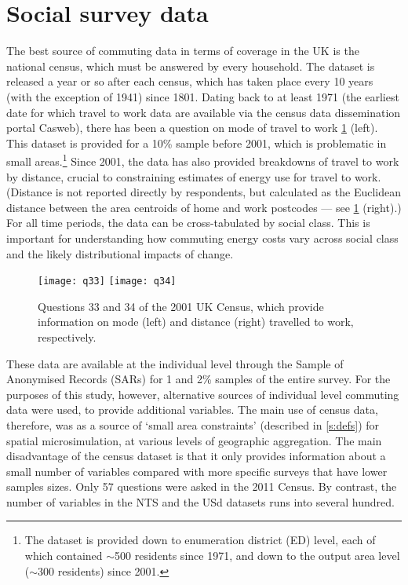 \section{Social survey data}
\label{ssocialsurveydata}
The best source of commuting data in terms of coverage in the UK
is the national census, which must be answered by every household. The dataset is
released a year or so after
each census, which has taken place every 10 years (with the exception of 1941)
since 1801. Dating back to at least 1971 (the earliest date for which travel to
work data are available via the census data dissemination portal Casweb), there
has been a question on mode of travel to work \cref{fq33} (left).
This dataset is provided for a 10\% sample before 2001, which is
problematic in small areas.\footnote{The dataset is provided down to enumeration
district (ED) level, each of which contained $\sim$500 residents since 1971, and
down to the output area level ($\sim$300 residents) since 2001.} Since 2001,
the data has also provided breakdowns of travel to work by distance, crucial to
constraining estimates of energy use for travel to work. (Distance is not
reported directly by respondents, but calculated as the Euclidean distance
between the area centroids of home and work postcodes --- see \cref{fq33}
(right).) For all time periods, the data can be cross-tabulated by social class.
This is important for understanding how commuting energy costs vary across
social class and the likely distributional impacts of change. 

\begin{figure}[h]
 \centering
 \texttt{[image: q33]}
 \texttt{[image: q34]}
 \caption[Questions 33 and 34 of the 2001 UK Census]{Questions 33 and 34 of the
2001 UK Census, which provide information
on mode (left) and distance (right) travelled to work, respectively.}
 \label{fq33}
\end{figure}

These data are available at the individual level through the Sample of
Anonymised Records (SARs) for 1 and 2\% samples of the entire survey.
For the purposes of this study, however, alternative sources of individual
level commuting data were used, to provide additional variables. The main
use of census data, therefore, was as a source of `small area constraints'
(described in \cref{s:defs})
for spatial microsimulation, at various levels of geographic aggregation. 
The main disadvantage of the census
dataset is that it only provides information about a small number of variables
compared with more specific surveys that have lower samples sizes. Only 57
questions were asked in the 2011 Census. By contrast, the number of variables
in the NTS and the USd datasets runs into several hundred.

